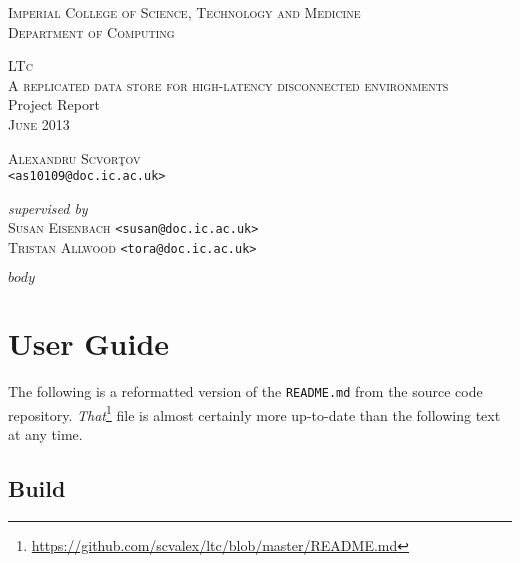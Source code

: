 \documentclass[11pt, a4paper, titlepage]{article}
\makeatletter
\renewcommand{\href}[2]{#2\footnote{\url{#1}}}
\newcommand{\myauthor}{Alexandru Scvor\c tov}
\newcommand{\myemail}{\email{<as10109@doc.ic.ac.uk>}}
\newcommand{\email}[1]{\nolinkurl{#1}}
\makeatother
\begin{document}
\begin{titlepage}

  \vspace*{\fill}

  \begin{center}
    \textsc{Imperial College of Science, Technology and Medicine}\\[0.1cm]
    \textsc{Department of Computing}

    \vspace{3cm}

    \textsc{\Huge LTc}\\[0.2cm]
    \textsc{\Large A replicated data store for high-latency disconnected environments}\\[1cm]
    {\Large Project Report}\\
    \textsc{June 2013}

    \vspace{7cm}

    \textsc{\Large \myauthor}\\[0.1cm]
    \myemail

    \vspace{1cm}

    \textit{supervised by}\\
    \textsc{Susan Eisenbach} \email{<susan@doc.ic.ac.uk>}\\
    \textsc{Tristan Allwood} \email{<tora@doc.ic.ac.uk>}
  \end{center}

  \vspace*{\fill}

\end{titlepage}

\newpage\null\thispagestyle{empty}\newpage

$body$

\clearpage


\clearpage
\appendix

\section{User Guide}
\label{sec:user-guide}

The following is a reformatted version of the \texttt{README.md} from
the source code repository.
\href{https://github.com/scvalex/ltc/blob/master/README.md}{\emph{That}}
file is almost certainly more up-to-date than the following text at
any time.

\subsection{Build}
\end{document}
